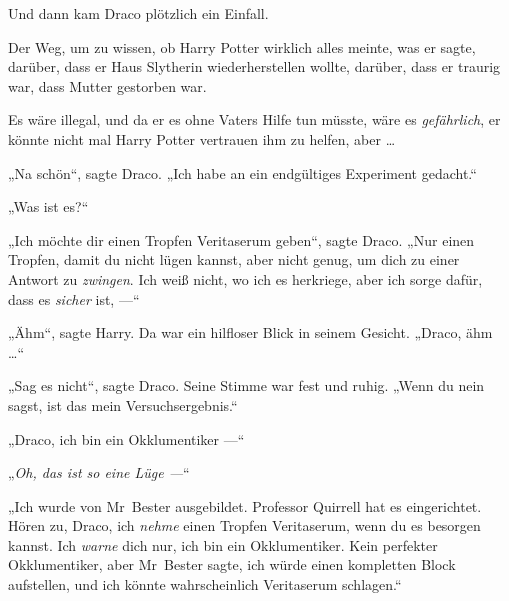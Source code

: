 Und dann kam Draco plötzlich ein Einfall.

Der Weg, um zu wissen, ob Harry Potter wirklich alles meinte, was er sagte, darüber, dass er Haus Slytherin wiederherstellen wollte, darüber, dass er traurig war, dass Mutter gestorben war.

Es wäre illegal, und da er es ohne Vaters Hilfe tun müsste, wäre es \emph{gefährlich}, er könnte nicht mal Harry Potter vertrauen ihm zu helfen, aber …

„Na schön“, sagte Draco.
„Ich habe an ein endgültiges Experiment gedacht.“

„Was ist es?“

„Ich möchte dir einen Tropfen Veritaserum geben“, sagte Draco.
„Nur einen Tropfen, damit du nicht lügen kannst, aber nicht genug, um dich zu einer Antwort zu \emph{zwingen}. Ich weiß nicht, wo ich es herkriege, aber ich sorge dafür, dass es \emph{sicher} ist, —“

„Ähm“, sagte Harry. Da war ein hilfloser Blick in seinem Gesicht.
„Draco, ähm …“

„Sag es nicht“, sagte Draco. Seine Stimme war fest und ruhig.
„Wenn du nein sagst, ist das mein Versuchsergebnis.“

„Draco, ich bin ein Okklumentiker —“

„\emph{Oh, das ist so eine Lüge —}“

„Ich wurde von Mr~Bester ausgebildet. Professor Quirrell hat es eingerichtet. Hören zu, Draco, ich \emph{nehme} einen Tropfen Veritaserum, wenn du es besorgen kannst. Ich \emph{warne} dich nur, ich bin ein Okklumentiker. Kein perfekter Okklumentiker, aber Mr~Bester sagte, ich würde einen kompletten Block aufstellen, und ich könnte wahrscheinlich Veritaserum schlagen.“

